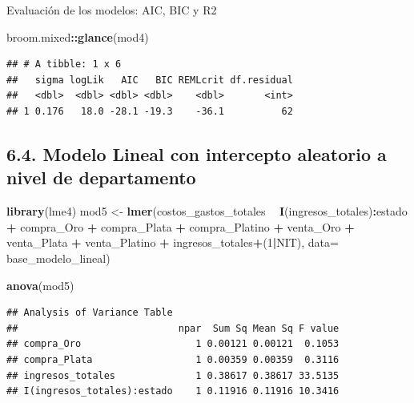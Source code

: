 \documentclass[
  11pt,
  a4paper,
]{book}
\newenvironment{Shaded}{\begin{snugshade}}{\end{snugshade}}
\newcommand{\DataTypeTok}[1]{\textcolor[rgb]{0.13,0.29,0.53}{#1}}
\newcommand{\DecValTok}[1]{\textcolor[rgb]{0.00,0.00,0.81}{#1}}
\newcommand{\KeywordTok}[1]{\textcolor[rgb]{0.13,0.29,0.53}{\textbf{#1}}}
\newcommand{\NormalTok}[1]{#1}
\newcommand{\OperatorTok}[1]{\textcolor[rgb]{0.81,0.36,0.00}{\textbf{#1}}}
\newcommand{\StringTok}[1]{\textcolor[rgb]{0.31,0.60,0.02}{#1}}
\begin{document}
Evaluación de los modelos: AIC, BIC y R2

\begin{Shaded}
\begin{Highlighting}[]
\NormalTok{broom.mixed}\OperatorTok{::}\KeywordTok{glance}\NormalTok{(mod4)}
\end{Highlighting}
\end{Shaded}

\begin{verbatim}
## # A tibble: 1 x 6
##   sigma logLik   AIC   BIC REMLcrit df.residual
##   <dbl>  <dbl> <dbl> <dbl>    <dbl>       <int>
## 1 0.176   18.0 -28.1 -19.3    -36.1          62
\end{verbatim}

\hypertarget{modelo-lineal-con-intercepto-aleatorio-a-nivel-de-departamento}{%
\subsection{6.4. Modelo Lineal con intercepto aleatorio a nivel de
departamento}\label{modelo-lineal-con-intercepto-aleatorio-a-nivel-de-departamento}}

\begin{Shaded}
\begin{Highlighting}[]
\KeywordTok{library}\NormalTok{(lme4)}
\NormalTok{mod5 <-}\StringTok{ }\KeywordTok{lmer}\NormalTok{(costos_gastos_totales }\OperatorTok{~}\StringTok{ }\KeywordTok{I}\NormalTok{(ingresos_totales)}\OperatorTok{:}\NormalTok{estado }\OperatorTok{+}\StringTok{  }\NormalTok{compra_Oro }\OperatorTok{+}\StringTok{ }\NormalTok{compra_Plata }\OperatorTok{+}\StringTok{ }\NormalTok{compra_Platino }\OperatorTok{+}\StringTok{ }\NormalTok{venta_Oro }\OperatorTok{+}\StringTok{ }\NormalTok{venta_Plata }\OperatorTok{+}\StringTok{ }\NormalTok{venta_Platino }\OperatorTok{+}\StringTok{ }\NormalTok{ingresos_totales}\OperatorTok{+}\NormalTok{(}\DecValTok{1}\OperatorTok{|}\NormalTok{NIT), }\DataTypeTok{data=}\NormalTok{ base_modelo_lineal) }

\KeywordTok{anova}\NormalTok{(mod5)}
\end{Highlighting}
\end{Shaded}

\begin{verbatim}
## Analysis of Variance Table
##                            npar  Sum Sq Mean Sq F value
## compra_Oro                    1 0.00121 0.00121  0.1053
## compra_Plata                  1 0.00359 0.00359  0.3116
## ingresos_totales              1 0.38617 0.38617 33.5135
## I(ingresos_totales):estado    1 0.11916 0.11916 10.3416
\end{verbatim}
\end{document}
